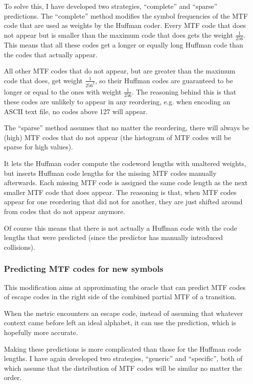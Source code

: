 \documentclass[a4paper]{scrreprt}
\begin{document}
To solve this, I have developed two strategies, ``complete'' and ``sparse''
predictions.
The ``complete'' method modifies the symbol frequencies of the MTF code that are
used as weights by the Huffman coder. Every MTF code that does not appear but is
smaller than the maximum code that does gets the weight \(\frac{1}{256}\). This
means that all these codes get a longer or equally long Huffman code than the
codes that actually appear.

All other MTF codes that do not appear, but are greater than the maximum code
that does, get weight \(\frac{1}{256^2}\), so their Huffman codes are guaranteed
to be longer or equal to the ones with weight \(\frac{1}{256}\). The reasoning
behind this is that these codes are unlikely to appear in any reordering, e.g.
when encoding an ASCII text file, no codes above 127 will appear.

The ``sparse'' method assumes that no matter the reordering, there will always
be (high) MTF codes that do not appear (the histogram of MTF codes will be
sparse for high values).

It lets the Huffman coder compute the codeword lengths with unaltered weights,
but inserts Huffman code lengths for the missing MTF codes manually afterwards.
Each missing MTF code is assigned the same code length as the next smaller MTF
code that does appear. The reasoning is that, when MTF codes appear for one
reordering that did not for another, they are just shifted around from codes
that do not appear anymore.

Of course this means that there is not actually a Huffman code with the code
lengths that were predicted (since the predictor has manually introduced
collisions).

\subsubsection{Predicting MTF codes for new symbols}

This modification aims at approximating the oracle that can predict MTF codes of
escape codes in the right side of the combined partial MTF of a transition.

When the metric encounters an escape code, instead of assuming that whatever
context came before left an ideal alphabet, it can use the prediction, which is
hopefully more accurate.

Making these predictions is more complicated than those for the Huffman code
lengths. I have again developed two strategies, ``generic'' and ``specific'',
both of which assume that the distribution of MTF codes will be similar no
matter the order.
\end{document}
